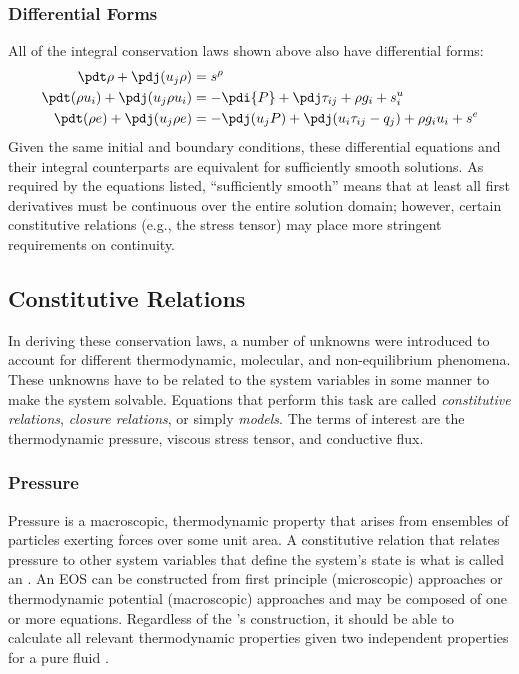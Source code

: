 \subsubsection{Differential Forms}
All of the integral conservation laws shown above also have differential forms:
\begin{align}
    \pdt \rho + \pdj(u_j \rho)           &= s^\rho \\
    \pdt (\rho u_i) + \pdj(u_j \rho u_i) &= -\pdi{P} + \pdj \tau_{ij} + \rho g_i + s^u_i \\
    \pdt (\rho e) + \pdj(u_j \rho{e})    &= -\pdj(u_j P) + \pdj(u_i \tau_{ij} - q_j) + \rho g_i u_i + s^e
\end{align}
Given the same initial and boundary conditions, these differential equations and their integral counterparts are equivalent for sufficiently smooth solutions.
As required by the equations listed, ``sufficiently smooth'' means that at least all first derivatives must be continuous over the entire solution domain; however, certain constitutive relations  (e.g., the stress tensor) may place more stringent requirements on continuity.




\subsection{Constitutive Relations}\label{Section:ConstitutiveRelations}
In deriving these conservation laws, a number of unknowns were introduced to account for different thermodynamic, molecular, and non-equilibrium phenomena.
These unknowns have to be related to the system variables in some manner to make the system solvable.
Equations that perform this task are called \textit{constitutive relations}, \textit{closure relations}, or simply \textit{models}.
The terms of interest are the thermodynamic pressure, viscous stress tensor, and conductive flux.

\subsubsection{Pressure}
Pressure is a macroscopic, thermodynamic property that arises from ensembles of particles exerting forces over some unit area.
A constitutive relation that relates pressure to other system variables that define the system's state is what is called an .
An EOS can be constructed from first principle (microscopic) approaches or thermodynamic potential (macroscopic) approaches and may be composed of one or more equations.
Regardless of the 's construction, it should be able to calculate all relevant thermodynamic properties given two independent properties for a pure fluid \cite{klein_thermodynamics_2011}.

